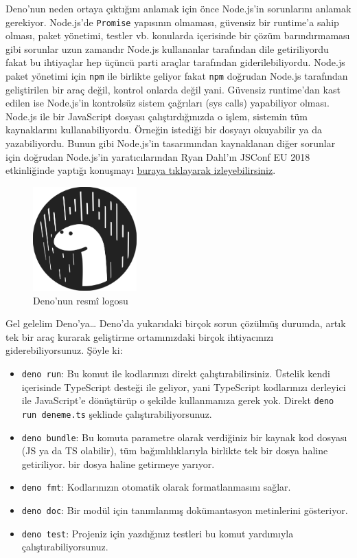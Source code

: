 \documentclass[11pt]{article}
\begin{document}
Deno'nun neden ortaya çıktığını anlamak için önce Node.js'in sorunlarını
anlamak gerekiyor. Node.js'de \texttt{Promise} yapısının olmaması, güvensiz bir
runtime'a sahip olması, paket yönetimi, testler vb. konularda içerisinde bir
çözüm barındırmaması gibi sorunlar uzun zamandır Node.js kullananlar
tarafından dile getiriliyordu fakat bu ihtiyaçlar hep üçüncü parti araçlar
tarafından giderilebiliyordu. Node.js paket yönetimi için \texttt{npm} ile birlikte
geliyor fakat \texttt{npm} doğrudan Node.js tarafından geliştirilen bir araç değil,
kontrol onlarda değil yani. Güvensiz runtime'dan kast edilen ise Node.js'in
kontrolsüz sistem çağrıları (sys calls) yapabiliyor olması. Node.js ile bir
JavaScript dosyası çalıştırdığınızda o işlem, sistemin tüm kaynaklarını
kullanabiliyordu. Örneğin istediği bir dosyayı okuyabilir ya da yazabiliyordu.
Bunun gibi Node.js'in tasarımından kaynaklanan diğer sorunlar için doğrudan
Node.js'in yaratıcılarından Ryan Dahl'ın JSConf EU 2018 etkinliğinde yaptığı
konuşmayı \href{https://www.youtube.com/watch?v=M3BM9TB-8yA}{buraya tıklayarak izleyebilirsiniz}.

\begin{figure}[htbp]
\centering
\includegraphics[height=4cm]{gorseller/deno-logo.png}
\caption{Deno'nun resmî logosu}
\end{figure}

Gel gelelim Deno'ya\ldots{} Deno'da yukarıdaki birçok sorun çözülmüş durumda, artık
tek bir araç kurarak geliştirme ortamınızdaki birçok ihtiyacınızı
giderebiliyorsunuz. Şöyle ki:
\begin{itemize}
\item \texttt{deno run}: Bu komut ile kodlarınızı direkt çalıştırabilirsiniz. Üstelik
kendi içerisinde TypeScript desteği ile geliyor, yani TypeScript
kodlarınızı derleyici ile JavaScript'e dönüştürüp o şekilde kullanmanıza
gerek yok. Direkt \texttt{deno run deneme.ts} şeklinde çalıştırabiliyorsunuz.
\item \texttt{deno bundle}: Bu komuta parametre olarak verdiğiniz bir kaynak kod dosyası
(JS ya da TS olabilir), tüm bağımlılıklarıyla birlikte tek bir dosya haline
getiriliyor. bir dosya haline getirmeye yarıyor.
\item \texttt{deno fmt}: Kodlarınızın otomatik olarak formatlanmasını sağlar.
\item \texttt{deno doc}: Bir modül için tanımlanmış dokümantasyon metinlerini
gösteriyor.
\item \texttt{deno test}: Projeniz için yazdığınız testleri bu komut yardımıyla
çalıştırabiliyorsunuz.
\end{itemize}
\end{document}
